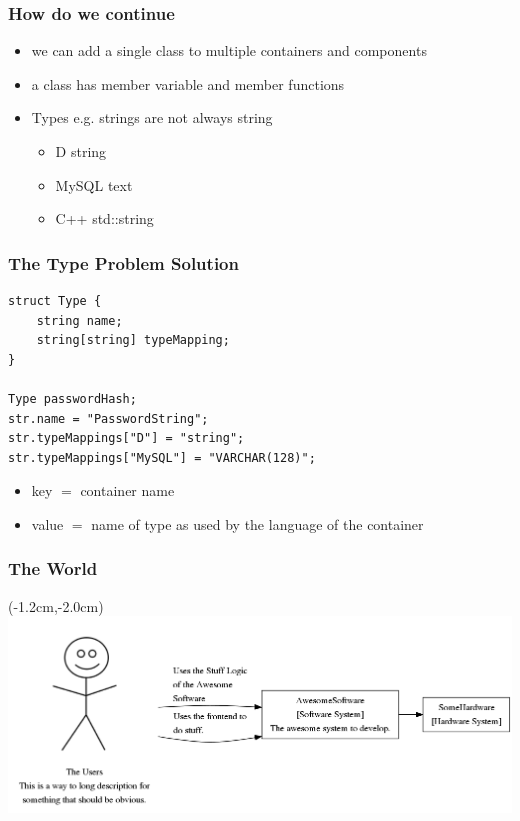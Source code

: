 \documentclass[xelatex,13pt]{beamer}
\begin{document}
\begin{frame}[fragile]
	\frametitle{How do we continue}
	\begin{itemize}
		\item we can add a single class to multiple containers and components
		\item a class has member variable and member functions
		\item Types \pause e.g. strings are not always string
		\begin{itemize}
			\item D string
			\item MySQL text
			\item C++ std::string
		\end{itemize}
	\end{itemize}
\end{frame}
\begin{frame}[fragile]
	\frametitle{The Type Problem Solution}
\begin{lstlisting}
struct Type {
    string name;
    string[string] typeMapping;
}

Type passwordHash;
str.name = "PasswordString";
str.typeMappings["D"] = "string";
str.typeMappings["MySQL"] = "VARCHAR(128)";
\end{lstlisting}
\pause
\begin{itemize}
	\item key \(=\) container name
	\item value \(=\) name of type as used by the language of the container
\end{itemize}
\end{frame}

\begin{frame}
	\frametitle{The World}
	\begin{textblock*}{0cm}(-1.2cm,-2.0cm)
		\includegraphics[width=1.0\paperwidth]{theworld.png}
	\end{textblock*}
\end{frame}
\end{document}
